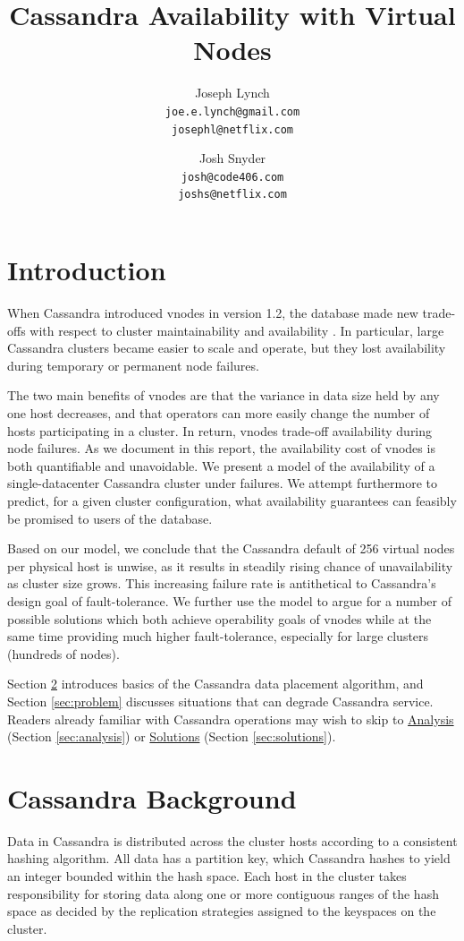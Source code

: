 \documentclass{article}
\title{Cassandra Availability with Virtual Nodes}
\author{
  Joseph Lynch\\
  \texttt{joe.e.lynch@gmail.com}\\
  \texttt{josephl@netflix.com}
  \and
  Josh Snyder\\
  \texttt{josh@code406.com}\\
  \texttt{joshs@netflix.com}
}
\begin{document}
\maketitle
\section{Introduction}
When Cassandra introduced vnodes in version 1.2, the database made new trade-offs
with respect to cluster maintainability and availability \cite{vnodes}
\cite{vnodesemail}. In particular, large Cassandra clusters became easier to scale
and operate, but they lost availability during temporary or permanent node failures.

The two main benefits of vnodes are that the variance in data size held by any
one host decreases, and that operators can more easily change the number of
hosts participating in a cluster. In return, vnodes trade-off availability during
node failures. As we document in this report, the availability cost of vnodes is
both quantifiable and unavoidable. We present a model of the availability of a
single-datacenter Cassandra cluster under failures. We attempt furthermore
to predict, for a given cluster configuration, what availability guarantees
can feasibly be promised to users of the database.

Based on our model, we conclude that the Cassandra default of 256 virtual nodes
per physical host is unwise, as it results in steadily rising chance of
unavailability as cluster size grows. This increasing failure rate is
antithetical to Cassandra's design goal of fault-tolerance. We further use
the model to argue for a number of possible solutions which both achieve
operability goals of vnodes while at the same time providing much higher
fault-tolerance, especially for large clusters (hundreds of nodes).

Section \ref{sec:background} introduces basics of the Cassandra data placement
algorithm, and Section \ref{sec:problem} discusses situations that can degrade
Cassandra service. Readers already familiar with Cassandra operations may wish
to skip to \hyperref[sec:analysis]{Analysis} (Section \ref{sec:analysis}) or
\hyperref[sec:solutions]{Solutions} (Section \ref{sec:solutions}).

\section{Cassandra Background}
\label{sec:background}
Data in Cassandra is distributed across the cluster hosts according to a
consistent hashing algorithm. All data has a partition key, which Cassandra
hashes to yield an integer bounded within the hash space. Each host in the
cluster takes responsibility for storing data along one or more contiguous
ranges of the hash space as decided by the replication strategies assigned
to the keyspaces on the cluster.
\end{document}
